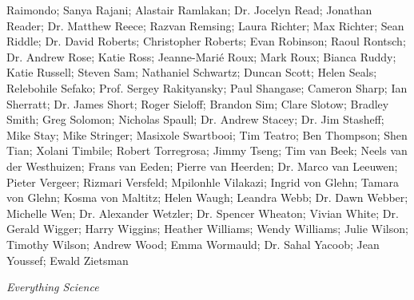 Raimondo; Sanya Rajani; Alastair Ramlakan; Dr. Jocelyn Read; Jonathan Reader; Dr. Matthew Reece; Razvan Remsing; Laura Richter; Max Richter; Sean Riddle; Dr. David Roberts; Christopher Roberts; Evan Robinson; Raoul Rontsch; Dr. Andrew Rose; Katie Ross; Jeanne-Marié Roux; Mark Roux; Bianca Ruddy; Katie Russell; Steven Sam; Nathaniel Schwartz; Duncan Scott; Helen Seals; Relebohile Sefako; Prof. Sergey Rakityansky; Paul Shangase; Cameron Sharp; Ian Sherratt; Dr. James Short; Roger Sieloff; Brandon Sim; Clare Slotow; Bradley Smith; Greg Solomon; Nicholas Spaull; Dr. Andrew Stacey; Dr. Jim Stasheff; Mike Stay; Mike Stringer; Masixole Swartbooi; Tim Teatro; Ben Thompson; Shen Tian; Xolani Timbile; Robert Torregrosa; Jimmy Tseng; Tim van Beek; Neels van der Westhuizen; Frans van Eeden; Pierre van Heerden; Dr. Marco van Leeuwen; Pieter Vergeer; Rizmari Versfeld; Mpilonhle Vilakazi; Ingrid von Glehn; Tamara von Glehn; Kosma von Maltitz; Helen Waugh; Leandra Webb; Dr. Dawn Webber; Michelle Wen; Dr. Alexander Wetzler; Dr. Spencer Wheaton; Vivian White; Dr. Gerald Wigger; Harry Wiggins; Heather Williams; Wendy Williams; Julie Wilson; Timothy Wilson; Andrew Wood; Emma Wormauld; Dr. Sahal Yacoob; Jean Youssef; Ewald Zietsman




\newpage
\thispagestyle{empty}

{\normalfont\sffamily\fontsize{22}\normalfont\itshape Everything Science} \par

